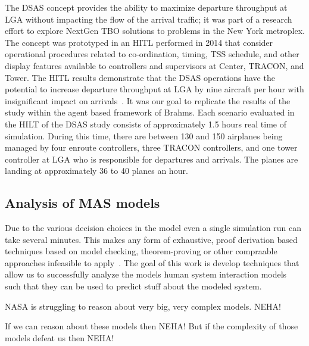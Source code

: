 \documentclass[12pt]{article}
\begin{document}
The DSAS concept provides the ability to maximize departure throughput at LGA without impacting the flow of the arrival traffic; it was part of a research effort to explore NextGen TBO solutions to problems in the New York metroplex. The concept was prototyped in an HITL performed in 2014 that consider operational procedures related to co-ordination, timing, TSS schedule, and other display features available to controllers and supervisors at Center, TRACON, and Tower. The HITL results demonstrate that the DSAS operations have the potential to increase departure throughput at LGA by nine aircraft per hour with insignificant impact on arrivals~\cite{dsas}.  It was our goal to replicate the results of the study within the agent based framework of Brahms. Each scenario evaluated in the HILT of the DSAS study consists of approximately 1.5 hours real time of simulation. During this time, there are between 130 and 150 airplanes being managed by four enroute controllers, three TRACON controllers, and one tower controller at LGA who is responsible for departures and arrivals. The planes are landing at approximately 36 to 40 planes an hour. 

\subsection{Analysis of MAS models} 
Due to the various decision choices in the model even a single simulation run can take several minutes. This makes any form of exhaustive, proof derivation based techniques based on model checking, theorem-proving or other compraable approaches infeasible to apply~\cite{hunter:aamas13,raimondi:aamas14}. The goal of this work is develop techniques that allow us to successfully analyze the models human system interaction models such that they can be used to predict stuff about the modeled system. 

NASA is struggling to reason about very big, very complex models. NEHA! 

If we can reason about these models then NEHA! But if the complexity of those models
defeat us then NEHA!
\end{document}
